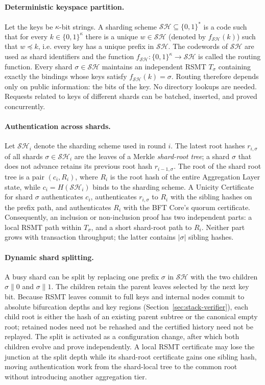 \documentclass[twocolumn]{article}
\begin{document}
\paragraph{Deterministic keyspace partition.}
Let the keys be $\kappa$-bit strings. A sharding scheme $\mathcal{SH}\subseteq\{0,1\}^{*}$ is a code such that for every $k\in\{0,1\}^\kappa$ there is a unique $w\in\mathcal{SH}$ (denoted by $f_{\mathcal{SH}}(k)$) such that $w\preceq k$, i.e.
every key has a unique prefix in $\mathcal{SH}$. The codewords of $\mathcal{SH}$ are used as shard identifiers and the function
$f_{\mathcal{SH}}\colon \{0,1\}^\kappa\rightarrow \mathcal{SH}$ is called the routing function.
Every shard $\sigma\in\mathcal{SH}$ maintains an independent RSMT $T_\sigma$ containing exactly the bindings whose keys satisfy $f_{\mathcal{SH}}(k)=\sigma$. Routing therefore depends only on public information: the bits of the key. No directory lookups are needed. Requests related to keys of different shards can be batched, inserted, and proved concurrently.

\paragraph{Authentication across shards.}
Let $\mathcal{SH}_i$ denote the sharding scheme used in round $i$. The latest root hashes $r_{i,\sigma}$ of all shards $\sigma\in\mathcal{SH}_i$ are the leaves of a Merkle \emph{shard-root tree}; a shard $\sigma$ that does not advance retains its previous root hash $r_{i-1,\sigma}$. The root of the shard root tree is a pair $(c_i,R_i)$, where $R_i$ is the root hash of the entire Aggregation Layer state, while $c_i=H(\mathcal{SH}_i)$ binds to the sharding scheme. A Unicity Certificate for shard $\sigma$ authenticates $c_i$, authenticates $r_{i,\sigma}$ to $R_i$ with the sibling hashes on the prefix path, and authenticates $R_i$ with the BFT Core's quorum certificate. Consequently, an inclusion or non-inclusion proof has two independent parts: a local RSMT path within $T_\sigma$, and a short shard-root path to $R_i$. Neither part grows with transaction throughput; the latter contains $|\sigma|$ sibling hashes.

\paragraph{Dynamic shard splitting.}
A busy shard can be split by replacing one prefix $\sigma$ in $\mathcal{SH}$ with the two children $\sigma\|0$ and $\sigma\|1$. The children retain the parent leaves selected by the next key bit. Because RSMT leaves commit to full keys and internal nodes commit to absolute bifurcation depths and key regions (Section~\ref{sec:stack-verifier}), each child root is either the hash of an existing parent subtree or the canonical empty root; retained nodes need not be rehashed and the certified history need not be replayed. The split is activated as a configuration change, after which both children evolve and prove independently. A local RSMT certificate may lose the junction at the split depth while its shard-root certificate gains one sibling hash, moving authentication work from the shard-local tree to the common root without introducing another aggregation tier.
\end{document}

